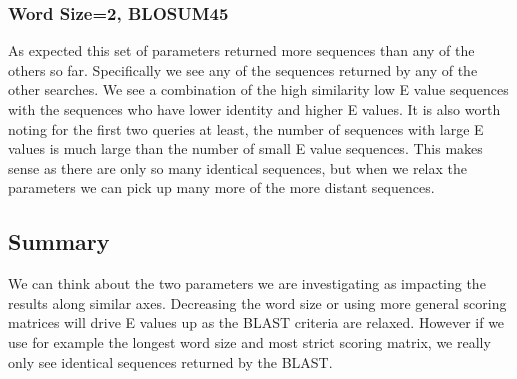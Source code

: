 \documentclass[12pt, oneside]{article}
\begin{document}
\subsubsection*{Word Size=2, BLOSUM45}
As expected this set of parameters returned more sequences than any of the others so far. Specifically we see  any of the sequences returned by any of the other searches. We see a combination of the high similarity low E value sequences with the sequences who have lower identity and higher E values. It is also worth noting for the first two queries at least, the number of sequences with large E values is much large than the number of small E value sequences. This makes sense as there are only so many identical sequences, but when we relax the parameters we can pick up many more of the more distant sequences.

\subsection*{Summary}
We can think about the two parameters we are investigating as impacting the results along similar axes. Decreasing the word size or using more general scoring matrices will drive E values up as the BLAST criteria are relaxed. However if we use for example the longest word size and most strict scoring matrix, we really only see identical sequences returned by the BLAST.
\end{document}

